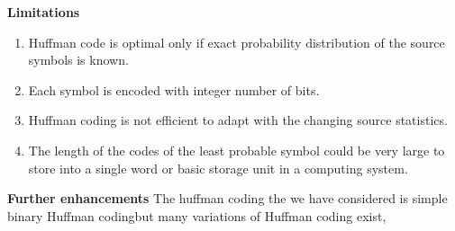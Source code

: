\documentclass[12pt]{report}
\begin{document}
\textbf{Limitations}
\begin{enumerate}
\item{Huffman code is optimal only if exact probability distribution of the source symbols is known.}
 
\item{Each symbol is encoded with integer number of bits.}
 
\item{Huffman coding is not efficient to adapt with the changing source statistics.}
 \item{The length of the codes of the least probable symbol could be very large to store into a single word or basic storage unit in a computing system.}
\end{enumerate}
	\textbf{Further enhancements}
The huffman coding the we have considered is simple binary Huffman codingbut many variations of Huffman coding exist,
\end{document}
